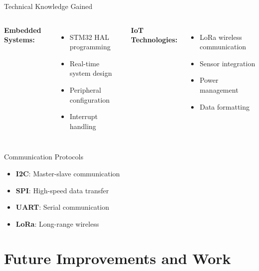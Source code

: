 \documentclass[aspectratio=169]{beamer}
\begin{document}
\begin{frame}{Technical Knowledge Gained}
\begin{columns}
\textbf{Embedded Systems:}
\begin{itemize}
    \item STM32 HAL programming
    \item Real-time system design
    \item Peripheral configuration
    \item Interrupt handling
\end{itemize}

\textbf{IoT Technologies:}
\begin{itemize}
    \item LoRa wireless communication
    \item Sensor integration
    \item Power management
    \item Data formatting
\end{itemize}
\end{columns}

\begin{block}{Communication Protocols}
\begin{itemize}
    \item \textbf{I2C}: Master-slave communication
    \item \textbf{SPI}: High-speed data transfer
    \item \textbf{UART}: Serial communication
    \item \textbf{LoRa}: Long-range wireless
\end{itemize}
\end{block}
\end{frame}

\section{Future Improvements and Work}
\end{document}
